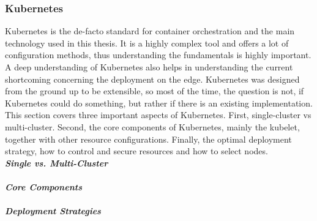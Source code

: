 \subsubsection{Kubernetes} \label{kubernetesStandardization efforts}
Kubernetes is the de-facto standard for container orchestration and the main technology used in this thesis. It is a highly complex tool and offers a lot of configuration methods, thus understanding the fundamentals is highly important. A deep understanding of Kubernetes also helps in understanding the current shortcoming concerning the deployment on the edge. Kubernetes was designed from the ground up to be extensible, so most of the time, the question is not, if Kubernetes could do something, but rather if there is an existing implementation.\\
This section covers three important aspects of Kubernetes. First, single-cluster vs multi-cluster. Second, the core components of Kubernetes, mainly the kubelet, together with other resource configurations. Finally, the optimal deployment strategy, how to control and secure resources and how to select nodes.
\vspace{0.5mm} \ \\
\textbf{\textit{Single vs. Multi-Cluster}}\\

\vspace{0.5mm} \ \\
\textbf{\textit{Core Components}}\\

\vspace{0.5mm} \ \\
\textbf{\textit{Deployment Strategies}}\\


